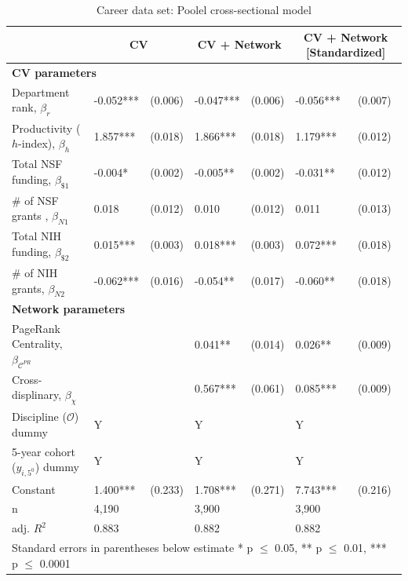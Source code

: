 \documentclass[10pt]{article}          %
\begin{document}
\begin{table}[h]
\caption{Career data set: Poolel cross-sectional model}
\begin{tabular}{m{5cm} m{1.5cm} m{1.5cm} m{1.5cm} m{1.5cm} p{1.5cm} p{1.5cm} }
\\
\hline
\hline
& \multicolumn{2}{c}{\textbf{CV}} & \multicolumn{2}{c}{\textbf{CV + Network}} & \multicolumn{2}{c}{\textbf{CV + Network [Standardized]}} \\ \hline
\multicolumn{7}{l}{\textbf{CV parameters}} \\
{Department rank, $\beta_r$}          & -0.052***  & (0.006) & -0.047***  & (0.006) & -0.056***   & (0.007) \\
{Productivity ($h$-index), $\beta_h$} & 1.857***   & (0.018) & 1.866***   & (0.018) & 1.179***    & (0.012) \\
{Total NSF funding, $\beta_{\$1}$}    & -0.004*    & (0.002) & -0.005**   & (0.002) & -0.031**    & (0.012) \\
{\# of NSF grants , $\beta_{N1}$}     & 0.018      & (0.012) & 0.010      & (0.012) & 0.011       & (0.013) \\
{Total NIH funding, $\beta_{\$2}$}    & 0.015***   & (0.003) & 0.018***   & (0.003) & 0.072***    & (0.018) \\
{\# of NIH grants, $\beta_{N2}$}      & -0.062***  & (0.016) & -0.054**   & (0.017) & -0.060**    & (0.018) \\ \hline

\multicolumn{7}{l}{\textbf{Network parameters}} \\
{PageRank Centrality, $\beta_{\mathscr{C}^{PR}}$}   &  &            & 0.041**     & (0.014) & 0.026**   & (0.009) \\
{Cross-displinary, $\beta_{\chi}$}       &  &            & 0.567***    & (0.061) & 0.085***  & (0.009) \\ \hline

{Discipline ($\mathscr{O}$) dummy}                & Y &  & Y &  & Y &  \\
{5-year cohort ($y_{i,5^0}$) dummy}   & Y &  & Y &  & Y & \\
{Constant}                            & 1.400*** & (0.233) & 1.708*** & (0.271) & 7.743*** & (0.216) \\ \hline

{n}                                   & 4,190 &  & 3,900 &  & 3,900 & \\
{adj. $R^2$}                          & 0.883 &  & 0.882 &  & 0.882 & \\ \hline \hline
\multicolumn{7}{l}{\footnotesize{Standard errors in parentheses below estimate * p $\leq$ 0.05, ** p $\leq$ 0.01, *** p $\leq$ 0.0001}}

\end{tabular}
\label{tbl:sT2}
\end{table}
\end{document}
